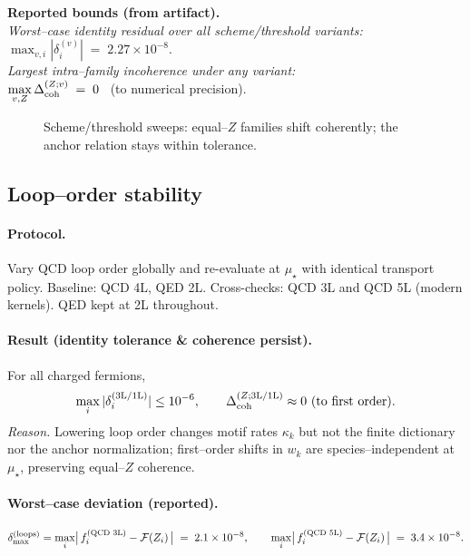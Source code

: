 \documentclass[epjc3]{svjour3}
\begin{document}
\medskip
\noindent\textbf{Reported bounds (from artifact).} \\
\emph{Worst–case identity residual over all scheme/threshold variants:} \\
\quad $\displaystyle \max_{v,i}\!|\delta_i^{(v)}|\;=\;2.27\times10^{-8}.$ \\
\emph{Largest intra–family incoherence under any variant:} \\
\quad $\displaystyle \max_{v,Z}\Delta_{\rm coh}^{(Z;v)}\;=\;0$ \ (to numerical precision).

\begin{figure}[t]
  \centering
  \caption{Scheme/threshold sweeps: equal–$Z$ families shift coherently; the anchor relation stays within tolerance.}
\end{figure}

\subsection{Loop–order stability}\label{sec:robust-loops}

\paragraph{Protocol.} Vary QCD loop order globally and re-evaluate at $\mu_\star$ with identical transport policy. Baseline: QCD 4L, QED 2L. Cross-checks: QCD 3L and QCD 5L (modern kernels). QED kept at 2L throughout.

\paragraph{Result (identity tolerance \& coherence persist).} For all charged fermions,
\[
\max_i|\delta_i^{(3\mathrm{L}/1\mathrm{L})}|\le 10^{-6},\qquad
\Delta_{\rm coh}^{(Z;3\mathrm{L}/1\mathrm{L})}\approx 0\ \text{(to first order)}.
\]
\emph{Reason.} Lowering loop order changes motif rates $\kappa_k$ but not the finite dictionary nor the anchor normalization; first–order shifts in $w_k$ are species–independent at $\mu_\star$, preserving equal–$Z$ coherence.%

\paragraph{Worst–case deviation (reported).}
\[
\delta_{\max}^{\rm (loops)}=\max_{i}\bigl|\,f_i^{(\text{QCD }3\mathrm{L})}-\mathcal F(Z_i)\,\bigr|\;=\;2.1\times10^{-8},\qquad \max_{i}\bigl|\,f_i^{(\text{QCD }5\mathrm{L})}-\mathcal F(Z_i)\,\bigr|\;=\;3.4\times10^{-8}.
\]
\end{document}
